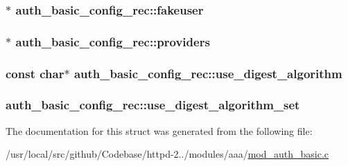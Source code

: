 \subsubsection[{\texorpdfstring{fakeuser}{fakeuser}}]{$\ast$ auth\+\_\+basic\+\_\+config\+\_\+rec\+::fakeuser}\hypertarget{structauth__basic__config__rec_a451437c491dc890f7dca8dca3659e738}{}\label{structauth__basic__config__rec_a451437c491dc890f7dca8dca3659e738}
\subsubsection[{\texorpdfstring{providers}{providers}}]{$\ast$ auth\+\_\+basic\+\_\+config\+\_\+rec\+::providers}\hypertarget{structauth__basic__config__rec_a143819877a61d8e772d08cc033ec81be}{}\label{structauth__basic__config__rec_a143819877a61d8e772d08cc033ec81be}
\subsubsection[{\texorpdfstring{use\+\_\+digest\+\_\+algorithm}{use_digest_algorithm}}]{\setlength{\rightskip}{0pt plus 5cm}const char$\ast$ auth\+\_\+basic\+\_\+config\+\_\+rec\+::use\+\_\+digest\+\_\+algorithm}\hypertarget{structauth__basic__config__rec_a7f30397d931d68436df1e63d511cdfc2}{}\label{structauth__basic__config__rec_a7f30397d931d68436df1e63d511cdfc2}
\subsubsection[{\texorpdfstring{use\+\_\+digest\+\_\+algorithm\+\_\+set}{use_digest_algorithm_set}}]{ auth\+\_\+basic\+\_\+config\+\_\+rec\+::use\+\_\+digest\+\_\+algorithm\+\_\+set}\hypertarget{structauth__basic__config__rec_aec014132565fd16aa0c667da77373c7f}{}\label{structauth__basic__config__rec_aec014132565fd16aa0c667da77373c7f}


The documentation for this struct was generated from the following file\+:\begin{DoxyCompactItemize}
\item 
/usr/local/src/github/\+Codebase/httpd-\/2../modules/aaa/\hyperlink{mod__auth__basic_8c}{mod\+\_\+auth\+\_\+basic.\+c}\end{DoxyCompactItemize}
